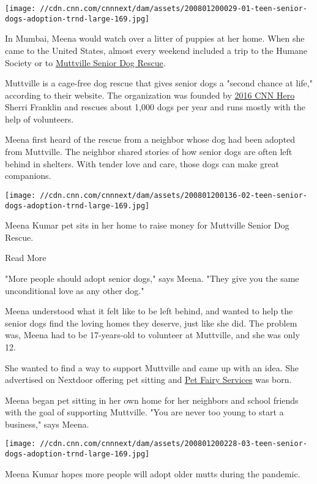 \texttt{[image: //cdn.cnn.com/cnnnext/dam/assets/200801200029-01-teen-senior-dogs-adoption-trnd-large-169.jpg]}

In Mumbai, Meena would watch over a litter of puppies at her home. When
she came to the United States, almost every weekend included a trip to
the Humane Society or to
\href{https://www.cnn.com/2020/04/29/us/coronavirus-animal-shelters-muttville-senior-dog-adoptions-cnnheroes/index.html}{Muttville
Senior Dog Rescue}.

Muttville is a cage-free dog rescue that gives senior dogs a "second
chance at life," according to their website. The organization was
founded by
\href{https://www.cnn.com/2016/07/07/us/cnn-hero-sherri-franklin/index.html}{2016
CNN Hero} Sherri Franklin and rescues about 1,000 dogs per year and runs
mostly with the help of volunteers.

Meena first heard of the rescue from a neighbor whose dog had been
adopted from Muttville. The neighbor shared stories of how senior dogs
are often left behind in shelters. With tender love and care, those dogs
can make great companions.

\texttt{[image: //cdn.cnn.com/cnnnext/dam/assets/200801200136-02-teen-senior-dogs-adoption-trnd-large-169.jpg]}

Meena Kumar pet sits in her home to raise money for Muttville Senior Dog
Rescue.

Read More

"More people should adopt senior dogs," says Meena. "They give you the
same unconditional love as any other dog."

Meena understood what it felt like to be left behind, and wanted to help
the senior dogs find the loving homes they deserve, just like she did.
The problem was, Meena had to be 17-years-old to volunteer at Muttville,
and she was only 12.

She wanted to find a way to support Muttville and came up with an idea.
She advertised on Nextdoor offering pet sitting and
\href{https://petfairyservices.com/}{Pet Fairy Services} was born.

Meena began pet sitting in her own home for her neighbors and school
friends with the goal of supporting Muttville. "You are never too young
to start a business," says Meena.

\texttt{[image: //cdn.cnn.com/cnnnext/dam/assets/200801200228-03-teen-senior-dogs-adoption-trnd-large-169.jpg]}

Meena Kumar hopes more people will adopt older mutts during the
pandemic.

